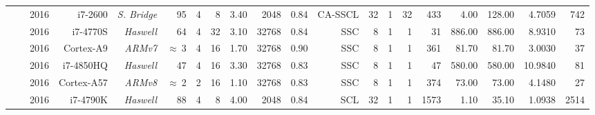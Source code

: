 \begin{table}[htp]
{{\begin{tabular}{|r|r r|r r r r r r|r r|r r r r|r r|r r r|}
                                                                 & \cite{Sarkis2016}    & 2016          & i7-2600            & \textit{S. Bridge} &          95  & {\color{Paired-1}4} &   8           & 3.40           &  2048    & 0.84     &   CA-SSCL          & 32            &                     1  & 32                &                     433  &                     4.00  &  128.00               &  4.7059        &    742             \\
                                                                 & \cite{Giard2016b}    & 2016          & i7-4770S           & \textit{Haswell}   &          64  & {\color{Paired-1}4} &  32           & 3.10           & 32768    & 0.84     &      SSC           &  8            &                     1  &  1                &                      31  &                   886.00  &  886.00               &  8.9310        &     73             \\
                                                                 & \cite{Giard2016b}    & 2016          & Cortex-A9          & \textit{ARMv7}     & $\approx~$3  & {\color{Paired-1}4} &  16           & 1.70           & 32768    & 0.90     &      SSC           &  8            &                     1  &  1                &                     361  &                    81.70  &   81.70               &  3.0030        &     37             \\
                                                                 & \cite{Cassagne2016b} & 2016          & i7-4850HQ          & \textit{Haswell}   &          47  & {\color{Paired-1}4} &  16           & 3.30           & 32768    & 0.83     &      SSC           &  8            &                     1  &  1                &                      47  &                   580.00  &  580.00               & 10.9840        &     81             \\
                                                                 & \cite{Cassagne2016b} & 2016          & Cortex-A57         & \textit{ARMv8}     & $\approx~$2  & {\color{Paired-1}2} &  16           & 1.10           & 32768    & 0.83     &      SSC           &  8            &                     1  &  1                &                     374  &                    73.00  &   73.00               &  4.1480        &     27             \\
                                                                 & \cite{Shen2016}      & 2016          & i7-4790K           & \textit{Haswell}   &          88  & {\color{Paired-1}4} &   8           & 4.00           &  2048    & 0.84     &       SCL          & 32            &                     1  &  1                &                    1573  &                     1.10  &   35.10               &  1.0938        &   2514             \\

\end{tabular}}}
\end{table}
